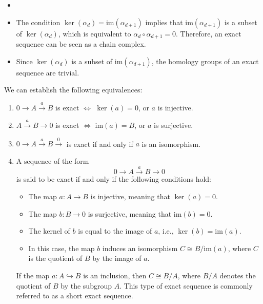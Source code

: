 \begin{remark}
	\begin{itemize}
		\item[]

		\item The condition $\ker(\alpha_{d}) = \mathrm{im}(\alpha_{d+1})$ implies that
			$\mathrm{im}(\alpha_{d+1})$ is a subset of $\ker(\alpha_{d})$, which is
			equivalent to $\alpha_{d} \circ \alpha_{d+1}= 0$. Therefore, an exact
			sequence can be seen as a chain complex.

		\item Since $\ker(\alpha_{d})$ is a subset of $\mathrm{im}(\alpha_{d+1})$,
			the homology groups of an exact sequence are trivial.
	\end{itemize}
\end{remark}

\begin{proposition}
	We can establish the following equivalences:
	\begin{enumerate}
		\item $0 \xrightarrow{}A \xrightarrow{a}B$ is exact $\Longleftrightarrow$ $\ker
			(a) = 0$, or $a$ is injective.

		\item $A \xrightarrow{a}B \rightarrow 0$ is exact $\Longleftrightarrow$ $\mathrm{im}
			(a) = B$, or $a$ is surjective.

		\item $0 \xrightarrow{}A \xrightarrow{a}B \xrightarrow 0$ is exact if and only
			if $a$ is an isomorphism.

		\item A sequence of the form
			\begin{equation}
				0 \xrightarrow{}A \xrightarrow{a}B \xrightarrow{}0
			\end{equation}
			is said to be exact if and only if the following conditions hold:
			\begin{itemize}
				\item The map $a: A \rightarrow B$ is injective, meaning that
					$\ker(a) = 0$.

				\item The map $b: B \rightarrow 0$ is surjective, meaning that
					$\mathrm{im}(b) = 0$.

				\item The kernel of $b$ is equal to the image of $a$, i.e.,
					$\ker(b) = \mathrm{im}(a)$.

				\item In this case, the map $b$ induces an isomorphism
					$C \cong B/\mathrm{im}(a)$, where $C$ is the quotient of $B$ by the image
					of $a$.
			\end{itemize}
			If the map $a: A \hookrightarrow B$ is an inclusion, then $C \cong B/A$,
			where $B/A$ denotes the quotient of $B$ by the subgroup $A$. This type of exact
			sequence is commonly referred to as a short exact sequence.
	\end{enumerate}
\end{proposition}

